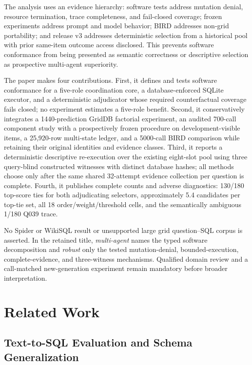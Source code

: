 \documentclass[applsci,article,submit,moreauthors]{Definitions/mdpi}
\begin{document}
The analysis uses an evidence hierarchy: software tests address mutation denial, resource termination, trace completeness, and fail-closed coverage; frozen experiments address prompt and model behavior; BIRD addresses non-grid portability; and release v3 addresses deterministic selection from a historical pool with prior same-item outcome access disclosed. This prevents software conformance from being presented as semantic correctness or descriptive selection as prospective multi-agent superiority.

The paper makes four contributions. First, it defines and tests software conformance for a five-role coordination core, a database-enforced SQLite executor, and a deterministic adjudicator whose required counterfactual coverage fails closed; no experiment estimates a five-role benefit. Second, it conservatively integrates a 1440-prediction GridDB factorial experiment, an audited 700-call component study with a prospectively frozen procedure on development-visible items, a 25,920-row multi-state ledger, and a 5000-call BIRD comparison while retaining their original identities and evidence classes. Third, it reports a deterministic descriptive re-execution over the existing eight-slot pool using three query-blind constructed witnesses with distinct database hashes; all methods choose only after the same shared 32-attempt evidence collection per question is complete. Fourth, it publishes complete counts and adverse diagnostics: 130/180 top-score ties for both adjudicating selectors, approximately 5.4 candidates per top-tie set, all 18 order/weight/threshold cells, and the semantically ambiguous 1/180 Q039 trace.

No Spider or WikiSQL result or unsupported large grid question--SQL corpus is asserted. In the retained title, \emph{multi-agent} names the typed software decomposition and \emph{robust} only the tested mutation-denial, bounded-execution, complete-evidence, and three-witness mechanisms. Qualified domain review and a call-matched new-generation experiment remain mandatory before broader interpretation.

\section{Related Work}

\subsection{Text-to-SQL Evaluation and Schema Generalization}
\end{document}
